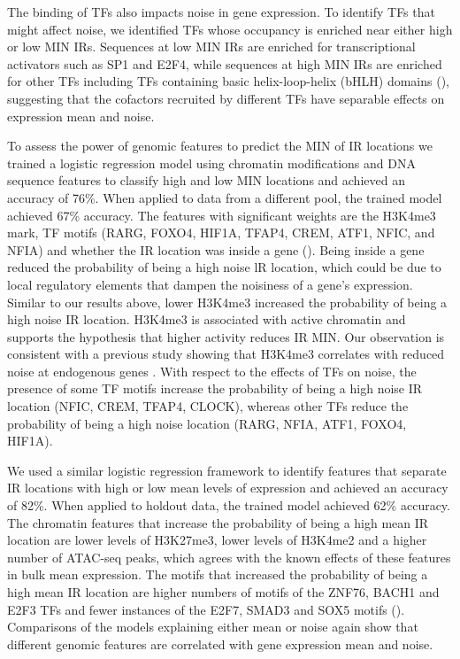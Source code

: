 The binding of TFs also impacts noise in gene expression. To identify TFs that might affect noise, we identified TFs whose occupancy is enriched near either high or low MIN IRs. Sequences at low MIN IRs are enriched for transcriptional activators such as SP1 and E2F4, while sequences at high MIN IRs are enriched for other TFs including TFs containing basic helix-loop-helix (bHLH) domains (), suggesting that the cofactors recruited by different TFs have separable effects on expression mean and noise. 

To assess the power of genomic features to predict the MIN of IR locations we trained a logistic regression model using chromatin modifications and DNA sequence features to classify high and low MIN locations and achieved an accuracy of 76\%. When applied to data from a different pool, the trained model achieved 67\% accuracy. The features with significant weights are the H3K4me3 mark, TF motifs (RARG, FOXO4, HIF1A, TFAP4, CREM, ATF1, NFIC, and NFIA) and whether the IR location was inside a gene (). Being inside a gene reduced the probability of being a high noise lR location, which could be due to local regulatory elements that dampen the noisiness of a gene’s expression. Similar to our results above, lower H3K4me3 increased the probability of being a high noise IR location. H3K4me3 is associated with active chromatin and supports the hypothesis that higher activity reduces IR MIN. Our observation is consistent with a previous study showing that H3K4me3 correlates with reduced noise at endogenous genes \cite{faureaj_lehnerb:SystematicAnalysis2017}. With respect to the effects of TFs on noise, the presence of some TF motifs increase the probability of being a high noise IR location (NFIC, CREM, TFAP4, CLOCK), whereas other TFs reduce the probability of being a high noise location (RARG, NFIA, ATF1, FOXO4, HIF1A). 

We used a similar logistic regression framework to identify features that separate IR locations with high or low mean levels of expression and achieved an accuracy of 82\%. When applied to holdout data, the trained model achieved 62\% accuracy. The chromatin features that increase the probability of being a high mean IR location are lower levels of H3K27me3, lower levels of H3K4me2 and a higher number of ATAC-seq peaks, which agrees with the known effects of these features in bulk mean expression. The motifs that increased the probability of being a high mean IR location are higher numbers of motifs of the ZNF76, BACH1 and E2F3 TFs and fewer instances of the E2F7, SMAD3 and SOX5 motifs (). Comparisons of the models explaining either mean or noise again show that different genomic features are correlated with gene expression mean and noise.

